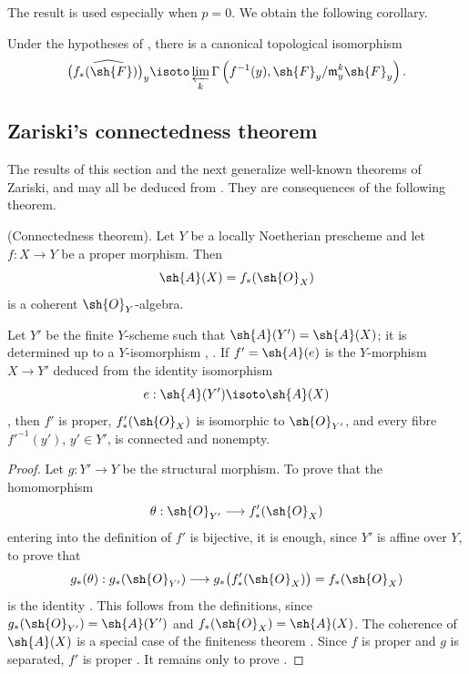 \begin{env}[4.2.3]
\label{III.4.2.3}
The result  is used especially when $p=0$.
We obtain the following corollary.
\end{env}

\begin{corollary}[4.2.4]
\label{III.4.2.4}
Under the hypotheses of , there is a canonical
topological isomorphism
\[
  \widehat{\bigl(f_*(\sh{F})\bigr)_y}
  \isoto
  \varprojlim_k
  \Gamma\left(
    f^{-1}(y),
    \sh{F}_y/\mathfrak{m}_y^k\sh{F}_y
  \right).
\]
\end{corollary}


\subsection{Zariski's connectedness theorem}
\label{subsection:III.4.3}
\label{III.4.3}

The results of this section and the next generalize well-known
theorems of Zariski, and may all be deduced from
.  They are consequences of the following theorem.

\begin{theorem}[4.3.1]
\label{III.4.3.1}
\textnormal{(Connectedness theorem).}
Let $Y$ be a locally Noetherian prescheme and let $f:X\to Y$ be a
proper morphism.  Then
\[
  \sh{A}(X)=f_*(\sh{O}_X)
\]
is a coherent $\sh{O}_Y$-algebra.


Let $Y'$ be the finite $Y$-scheme such that
$\sh{A}(Y')=\sh{A}(X)$; it is determined up to a $Y$-isomorphism
, .
If $f'=\sh{A}(e)$ is the $Y$-morphism $X\to Y'$ deduced from the
identity isomorphism
\[
  e:\sh{A}(Y')\isoto\sh{A}(X)
\]
, then $f'$ is proper,
$f'_*(\sh{O}_X)$ is isomorphic to $\sh{O}_{Y'}$, and every fibre
$f'^{-1}(y')$, $y'\in Y'$, is connected and nonempty.
\end{theorem}

\begin{proof}
Let $g:Y'\to Y$ be the structural morphism.  To prove that the
homomorphism
\[
  \theta:\sh{O}_{Y'}\longrightarrow f'_*(\sh{O}_X)
\]
entering into the definition of $f'$ is bijective, it is enough,
since $Y'$ is affine over $Y$, to prove that
\[
  g_*(\theta):
  g_*(\sh{O}_{Y'})
  \longrightarrow
  g_*\bigl(f'_*(\sh{O}_X)\bigr)
  =
  f_*(\sh{O}_X)
\]
is the identity .  This follows from the
definitions, since
$g_*(\sh{O}_{Y'})=\sh{A}(Y')$ and
$f_*(\sh{O}_X)=\sh{A}(X)$.
The coherence of $\sh{A}(X)$ is a special case of the finiteness
theorem .  Since $f$ is proper and $g$ is separated,
$f'$ is proper .  It remains only to prove
.
\end{proof}

